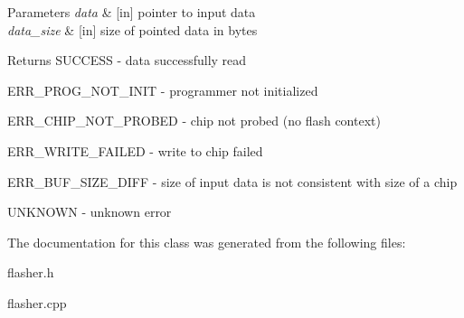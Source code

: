 \begin{DoxyParams}{Parameters}
{\em data} & \mbox{[}in\mbox{]} pointer to input data \\
\hline
{\em data\-\_\-size} & \mbox{[}in\mbox{]} size of pointed data in bytes \\
\hline
\end{DoxyParams}
\begin{DoxyReturn}{Returns}
S\-U\-C\-C\-E\-S\-S -\/ data successfully read 

E\-R\-R\-\_\-\-P\-R\-O\-G\-\_\-\-N\-O\-T\-\_\-\-I\-N\-I\-T -\/ programmer not initialized 

E\-R\-R\-\_\-\-C\-H\-I\-P\-\_\-\-N\-O\-T\-\_\-\-P\-R\-O\-B\-E\-D -\/ chip not probed (no flash context) 

E\-R\-R\-\_\-\-W\-R\-I\-T\-E\-\_\-\-F\-A\-I\-L\-E\-D -\/ write to chip failed 

E\-R\-R\-\_\-\-B\-U\-F\-\_\-\-S\-I\-Z\-E\-\_\-\-D\-I\-F\-F -\/ size of input data is not consistent with size of a chip 

U\-N\-K\-N\-O\-W\-N -\/ unknown error 
\end{DoxyReturn}


The documentation for this class was generated from the following files\-:\begin{DoxyCompactItemize}
\item 
flasher.\-h\item 
flasher.\-cpp\end{DoxyCompactItemize}
